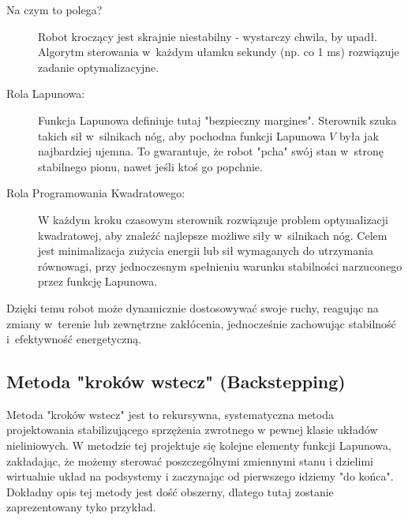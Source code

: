 \documentclass{article}
\begin{document}
\begin{description}
\begin{tcolorbox}[colback=magenta!5, colframe=magenta!75!black, title=Zastosowanie w robotyce]
        \begin{description}
            \item[Na czym to polega?] Robot kroczący jest skrajnie niestabilny - wystarczy
            chwila, by upadł. Algorytm sterowania w~każdym ułamku sekundy (np. co 1
            ms) rozwiązuje zadanie optymalizacyjne.
            \item[Rola Lapunowa:] Funkcja Lapunowa definiuje tutaj "bezpieczny margines".
            Sterownik szuka takich sił w~silnikach nóg, aby pochodna funkcji Lapunowa $V$
            była jak najbardziej ujemna. To gwarantuje, że robot "pcha" swój stan
            w~stronę stabilnego pionu, nawet jeśli ktoś go popchnie.
            \item[Rola Programowania Kwadratowego:] W każdym kroku czasowym sterownik rozwiązuje
            problem optymalizacji kwadratowej, aby znaleźć najlepsze możliwe siły
            w~silnikach nóg.
            Celem jest minimalizacja zużycia energii lub sił wymaganych do
            utrzymania równowagi, przy jednoczesnym spełnieniu warunku stabilności
            narzuconego przez funkcję Lapunowa.
        \end{description}
        
        Dzięki temu robot może dynamicznie dostosowywać swoje ruchy, reagując na
        zmiany w~terenie lub zewnętrzne zakłócenia, jednocześnie zachowując
        stabilność
        i~efektywność energetyczną.
        \end{tcolorbox}
    \end{description}
    
    \subsection{Metoda "kroków wstecz" (Backstepping)}
    Metoda "kroków wstecz" jest to rekursywna, systematyczna metoda projektowania stabilizującego sprzężenia zwrotnego w pewnej klasie układów nieliniowych.
    W metodzie tej projektuje się kolejne elementy funkcji Lapunowa, zakładając, że możemy sterować poszczególnymi zmiennymi stanu i dzielimi wirtualnie układ na podsystemy i zaczynając od pierwszego idziemy "do końca".
    Dokładny opis tej metody jest dość obszerny, dlatego tutaj zostanie zaprezentowany tyko przykład.
\end{document}

